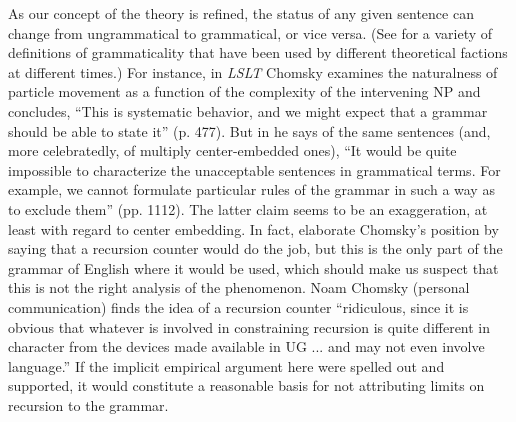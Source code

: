 As our concept of the theory is refined, the status of any given sentence can change from ungrammatical to grammatical, or vice versa. (See \citet{McCawley1979} for a variety of definitions of grammaticality that have been used by different theoretical factions at different times.) For instance, in \textit{LSLT} Chomsky examines the naturalness of particle movement as a function of the complexity of the intervening NP and concludes, ``This is systematic behavior, and we might expect that a grammar should be able to state it'' (p. 477). But in \aspectsq he says of the same sentences (and, more celebratedly, of multiply center-embedded ones), ``It would be quite impossible to characterize the unacceptable sentences in grammatical terms. For example, we cannot formulate particular rules of the grammar in such a way as to exclude them'' (pp. 11\textendash{}12). The latter claim seems to be an exaggeration, at least with regard to center embedding. In fact, \citet{KatzEtAl1976} elaborate Chomsky's position by saying that a recursion counter would do the job, but this is the only part of the grammar of English where it would be used, which should make us suspect that this is not the right analysis of the phenomenon. Noam Chomsky (personal communication) finds the idea of a recursion counter ``ridiculous, since it is obvious that whatever is involved in constraining recursion is quite different in character from the devices made available in UG ... and may not even involve language.'' If the implicit empirical argument here were spelled out and supported, it would constitute a reasonable basis for not attributing limits on recursion to the grammar.

